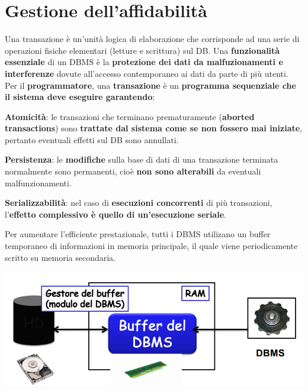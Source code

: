 \documentclass[10pt]{book}
\begin{document}
\section{Gestione dell'affidabilità}
Una transazione è un'unità logica di elaborazione che corrisponde ad una serie di operazioni fisiche elementari (letture e scrittura) sul DB. Una \textbf{funzionalità essenziale} di un DBMS è la \textbf{protezione dei dati da malfuzionamenti e interferenze} dovute all'accesso contemporaneo ai dati da parte di più utenti.\\
Per il \textbf{programmatore}, una \textbf{transazione} è un \textbf{programma sequenziale che il sistema deve eseguire garantendo}:
\begin{list}{}{}
	\item \textbf{Atomicità}: le transazioni che terminano prematuramente (\textbf{aborted transactions}) sono \textbf{trattate dal sistema come se non fossero mai iniziate}, pertanto eventuali effetti sul DB sono annullati.
	\item \textbf{Persistenza}: le \textbf{modifiche} sulla base di dati di una transazione terminata normalmente sono permanenti, cioè \textbf{non sono alterabili} da eventuali malfunzionamenti.
	\item \textbf{Serializzabilità}: nel caso di \textbf{esecuzioni concorrenti} di più transazioni, l'\textbf{effetto complessivo è quello di un'esecuzione seriale}.
\end{list}
Per aumentare l'efficiente prestazionale, tutti i DBMS utilizano un buffer temporaneo di informazioni in memoria principale, il quale viene periodicamente scritto su memoria secondaria.
\begin{center}
	\includegraphics[scale=0.5]{dbmsbuffer.png}
\end{center}
\end{document}
